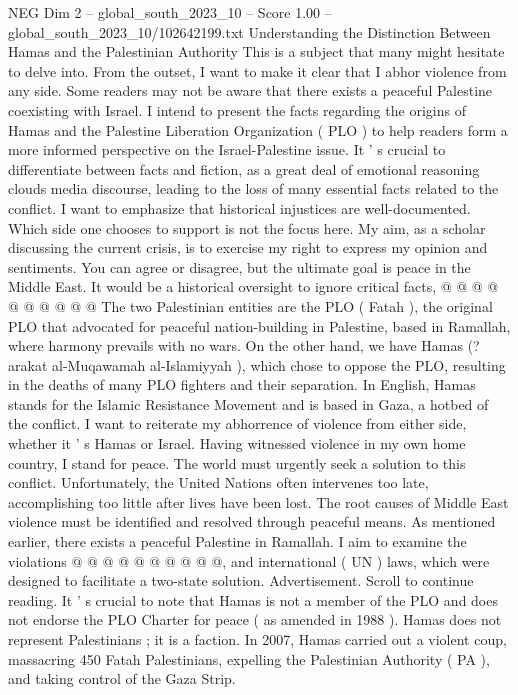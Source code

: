 \begin{textsample}{NEG Dim 2 – global\_south\_2023\_10 – Score 1.00 – global\_south\_2023\_10/102642199.txt}  \label{ex:f2_neg_393}
Understanding the Distinction Between Hamas and the Palestinian Authority This is a subject that many might hesitate to delve into.
From the outset, I want to make it clear that I abhor violence from any side.
Some readers may not be aware that there exists a peaceful Palestine coexisting with Israel.
I intend to present the facts regarding the origins of Hamas and the Palestine Liberation Organization ( PLO ) to help readers form a more informed perspective on the Israel-Palestine issue.
It ' s crucial to differentiate between facts and fiction, as a great deal of emotional reasoning clouds media discourse, leading to the loss of many essential facts related to the conflict.
I want to emphasize that historical injustices are well-documented.
Which side one chooses to support is not the focus here.
My aim, as a scholar discussing the current crisis, is to exercise my right to express my opinion and sentiments.
You can agree or disagree, but the ultimate goal is peace in the Middle East.
It would be a historical oversight to ignore critical facts, @ @ @ @ @ @ @ @ @ @ The two Palestinian entities are the PLO ( Fatah ), the original PLO that advocated for peaceful nation-building in Palestine, based in Ramallah, where harmony prevails with no wars.
On the other hand, we have Hamas (? arakat al-Muqawamah al-Islamiyyah ), which chose to oppose the PLO, resulting in the deaths of many PLO fighters and their separation.
In English, Hamas stands for the Islamic Resistance Movement and is based in Gaza, a hotbed of the conflict.
I want to reiterate my abhorrence of violence from either side, whether it ' s Hamas or Israel.
Having witnessed violence in my own home country, I stand for peace.
The world must urgently seek a solution to this conflict.
Unfortunately, the United Nations often intervenes too late, accomplishing too little after lives have been lost.
The root causes of Middle East violence must be identified and resolved through peaceful means.
As mentioned earlier, there exists a peaceful Palestine in Ramallah.
I aim to examine the violations @ @ @ @ @ @ @ @ @ @, and international ( UN ) laws, which were designed to facilitate a two-state solution.
Advertisement.
Scroll to continue reading.
It ' s crucial to note that Hamas is not a member of the PLO and does not endorse the PLO Charter for peace ( as amended in 1988 ).
Hamas does not represent Palestinians ; it is a faction.
In 2007, Hamas carried out a violent coup, massacring 450 Fatah Palestinians, expelling the Palestinian Authority ( PA ), and taking control of the Gaza Strip.

\end{textsample}
